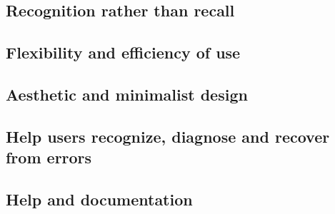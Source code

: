 \documentclass[fontsize=12pt,paper=a4]{scrartcl}
\begin{document}
\subsection{Recognition rather than recall}

\subsection{Flexibility and efficiency of use}

\subsection{Aesthetic and minimalist design}

\subsection{Help users recognize, diagnose and recover from errors}

\subsection{Help and documentation}
\end{document}
